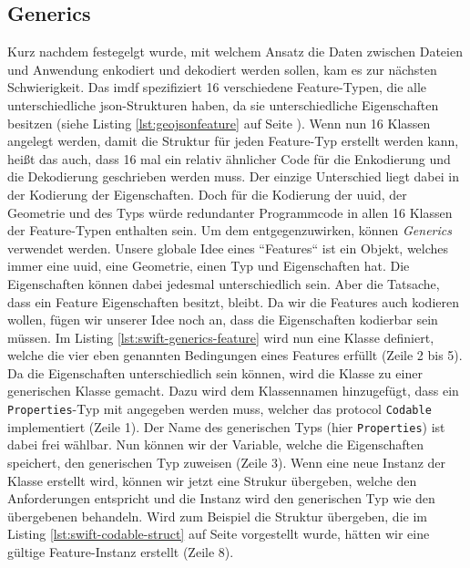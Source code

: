 \subsection{Generics}
\label{subsec:generics}
Kurz nachdem festegelgt wurde, mit welchem Ansatz die Daten zwischen Dateien und Anwendung enkodiert und dekodiert werden sollen, kam es zur nächsten Schwierigkeit.
Das \acl{imdf} spezifiziert 16 verschiedene Feature-Typen, die alle unterschiedliche \ac{json}-Strukturen haben, da sie unterschiedliche Eigenschaften besitzen (siehe Listing \ref{lst:geojsonfeature} auf Seite \pageref{lst:geojsonfeature}).
Wenn nun 16 Klassen angelegt werden, damit die Struktur für jeden Feature-Typ erstellt werden kann, heißt das auch, dass 16 mal ein relativ ähnlicher Code für die Enkodierung und die Dekodierung geschrieben werden muss.
Der einzige Unterschied liegt dabei in der Kodierung der Eigenschaften.
Doch für die Kodierung der \ac{uuid}, der Geometrie und des Typs würde redundanter Programmcode in allen 16 Klassen der Feature-Typen enthalten sein.
Um dem entgegenzuwirken, können \emph{Generics} verwendet werden.\pbreak%
%
Unsere globale Idee eines ``Features`` ist ein Objekt, welches immer eine \ac{uuid}, eine Geometrie, einen Typ und Eigenschaften hat.
Die Eigenschaften können dabei jedesmal unterschiedlich sein. Aber die Tatsache, dass ein Feature Eigenschaften besitzt, bleibt.
Da wir die Features auch kodieren wollen, fügen wir unserer Idee noch an, dass die Eigenschaften kodierbar sein müssen.
Im Listing \ref{lst:swift-generics-feature} wird nun eine Klasse definiert, welche die vier eben genannten Bedingungen eines Features erfüllt (Zeile 2 bis 5).
Da die Eigenschaften unterschiedlich sein können, wird die Klasse zu einer generischen Klasse gemacht.
Dazu wird dem Klassennamen hinzugefügt, dass ein \texttt{Properties}-Typ mit angegeben werden muss, welcher das \Gls{protocol} \texttt{Codable} implementiert (Zeile 1).
Der Name des generischen Typs (hier \texttt{Properties}) ist dabei frei wählbar.
Nun können wir der Variable, welche die Eigenschaften speichert, den generischen Typ zuweisen (Zeile 3).\pbreak%
%
Wenn eine neue Instanz der Klasse erstellt wird, können wir jetzt eine Strukur übergeben, welche den Anforderungen entspricht und die Instanz wird den generischen Typ wie den übergebenen behandeln.
Wird zum Beispiel die Struktur übergeben, die im Listing \ref{lst:swift-codable-struct} auf Seite \pageref{lst:swift-codable-struct} vorgestellt wurde, hätten wir eine gültige Feature-Instanz erstellt (Zeile 8).
